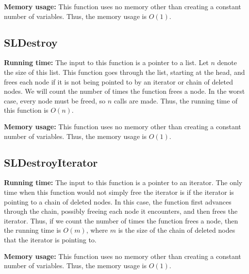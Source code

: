 \documentclass{article}
\begin{document}
\noindent\textbf{Memory usage:} This function uses no memory other than creating a constant number of variables. Thus, the memory usage is $O(1)$.

\subsection{SLDestroy}

\textbf{Running time:} The input to this function is a pointer to a list. Let $n$ denote the size of this list. This
function goes through the list, starting at the head, and frees each node if it is not being pointed to by an iterator
or chain of deleted nodes. We will count the number of times the function frees a node. In the worst case, every node
must be freed, so $n$ calls are made. Thus, the running time of this function is $O(n)$.

\noindent\textbf{Memory usage:} This function uses no memory other than creating a constant number of variables. Thus, the memory usage is $O(1)$.

\subsection{SLDestroyIterator}

\textbf{Running time:} The input to this function is a pointer to an iterator. The only time when this function would not
simply free the iterator is if the iterator is pointing to a chain of deleted nodes. In this case, the function first
advances through the chain, possibly freeing each node it encounters, and then frees the iterator. Thus, if we count the
number of times the function frees a node, then the running time is $O(m)$, where $m$ is the size of the chain of deleted
nodes that the iterator is pointing to.

\noindent\textbf{Memory usage:} This function uses no memory other than creating a constant number of variables. Thus, the memory usage is $O(1)$.
\end{document}
